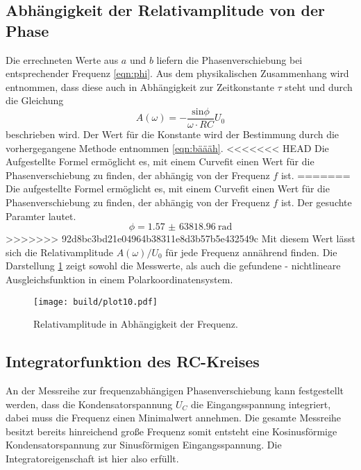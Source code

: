 \subsection{Abhängigkeit der Relativamplitude von der Phase}
Die errechneten Werte aus $a$ und $b$ liefern die Phasenverschiebung
bei entsprechender Frequenz \eqref{eqn:phi}. Aus dem physikalischen Zusammenhang wird entnommen,
dass diese auch in Abhängigkeit zur Zeitkonstante $\tau$ steht und durch die Gleichung 
\begin{equation*}
    A(\omega)=-\frac{\text{sin{$\phi$}}}{\omega \cdot RC}U_0
\end{equation*}
beschrieben wird. Der Wert für die Konstante wird der Bestimmung durch die vorhergegangene Methode entnommen \eqref{eqn:bäääh}.
<<<<<<< HEAD
Die Aufgestellte Formel ermöglicht es, mit einem Curvefit einen Wert für die Phasenverschiebung zu finden, der abhängig 
von der Frequenz $f$ ist. 
=======
Die aufgestellte Formel ermöglicht es, mit einem Curvefit einen Wert für die Phasenverschiebung zu finden, der abhängig 
von der Frequenz $f$ ist. Der gesuchte Paramter lautet.
\begin{equation*}
    \phi=\SI{1.57(6381896)}{\radian}
\end{equation*}
>>>>>>> 92d8bc3bd21e04964b38311e8d3b57b5e432549c
Mit diesem Wert lässt sich die Relativamplitude $A(\omega)/U_0$ für jede Frequenz annährend finden. Die Darstellung 
\ref{fig:pltmill}
zeigt sowohl die Messwerte, als auch die gefundene - nichtlineare Ausgleichsfunktion in einem Polarkoordinatensystem.

\begin{figure}
    \centering 
    \texttt{[image: build/plot10.pdf]}
    \caption{Relativamplitude in Abhängigkeit der Frequenz.}
    \label{fig:pltmill}
\end{figure} 

\subsection{Integratorfunktion des RC-Kreises}
An der Messreihe zur frequenzabhängigen Phasenverschiebung kann festgestellt werden, dass die Kondensatorspannung $U_{C}$ die Eingangsspannung
integriert, dabei muss die Frequenz einen Minimalwert annehmen. Die gesamte Messreihe besitzt bereits hinreichend große Frequenz somit entsteht eine Kosinusförmige Kondensatorspannung
zur Sinusförmigen Eingangsspannung. Die Integratoreigenschaft ist hier also erfüllt.



